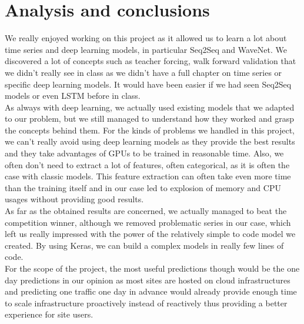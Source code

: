 \documentclass[11pt]{article}
\begin{document}
    \section{Analysis and conclusions}
We really enjoyed working on this project as it allowed us to learn a lot about time series and deep learning models, in particular Seq2Seq and WaveNet. We discovered a lot of concepts such as teacher forcing, walk forward validation that we didn't really see in class as we didn't have a full chapter on time series or specific deep learning models. It would have been easier if we had seen Seq2Seq models or even LSTM before in class. \\

    As always with deep learning, we actually used existing models that we adapted to our problem, but we still managed to understand how they worked and grasp the concepts behind them. For the kinds of problems we handled in this project, we can't really avoid using deep learning models as they provide the best results and they take advantages of GPUs to be trained in reasonable time. Also, we often don't need to extract a lot of features, often categorical, as it is often the case with classic models. This feature extraction can often take even more time than the training itself and in our case led to explosion of memory and CPU usages without providing good results.\\

    As far as the obtained results are concerned, we actually managed to beat the competition winner, although we removed problematic series in our case, which left us really impressed with the power of the relatively simple to code model we created. By using Keras, we can build a complex models in really few lines of code.\\

    For the scope of the project, the most useful predictions though would be the one day predictions in our opinion as most sites are hosted on cloud infrastructures and predicting one traffic one day in advance would already provide enough time to scale infrastructure proactively instead of reactively thus providing a better experience for site users.\\
\end{document}
